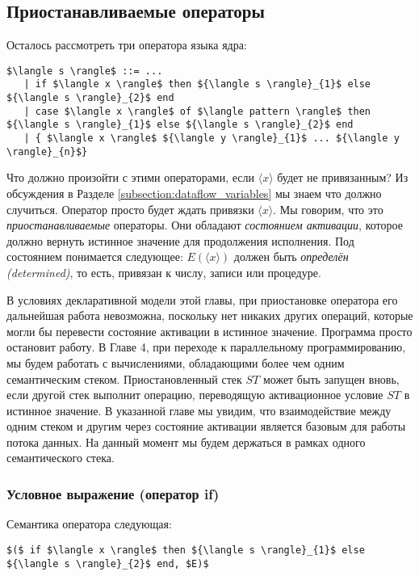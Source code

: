 \subsection{Приостанавливаемые операторы}

Осталось рассмотреть три оператора языка ядра:

\begin{lstlisting}
$\langle s \rangle$ ::= ...
   | if $\langle x \rangle$ then ${\langle s \rangle}_{1}$ else ${\langle s \rangle}_{2}$ end
   | case $\langle x \rangle$ of $\langle pattern \rangle$ then ${\langle s \rangle}_{1}$ else ${\langle s \rangle}_{2}$ end
   | { $\langle x \rangle$ ${\langle y \rangle}_{1}$ ... ${\langle y \rangle}_{n}$}
\end{lstlisting}

Что должно произойти с этими операторами, если $\langle x \rangle$ будет не привязанным? Из обсуждения в Разделе \ref{subsection:dataflow_variables} мы знаем что должно случиться. Оператор просто будет ждать привязки $\langle x \rangle$. Мы говорим, что это \emph{приостанавливаемые} операторы. Они обладают \emph{состоянием активации}, которое должно вернуть истинное значение для продолжения исполнения. Под состоянием понимается следующее: $E(\langle x \rangle)$ должен быть \emph{определён (determined)}, то есть, привязан к числу, записи или процедуре.

В условиях декларативной модели этой главы, при приостановке оператора его дальнейшая работа невозможна, поскольку нет никаких других операций, которые могли бы перевести состояние активации в истинное значение. Программа просто остановит работу. В Главе 4, при переходе к параллельному программированию, мы будем работать с вычислениями, обладающими более чем одним семантическим стеком. Приостановленный стек $ST$ может быть запущен вновь, если другой стек выполнит операцию, переводящую активационное условие $ST$ в истинное значение. В указанной главе мы увидим, что взаимодействие между одним стеком и другим через состояние активации является базовым для работы потока данных. На данный момент мы будем держаться в рамках одного семантического стека.

\subsubsection{Условное выражение (оператор if)}

Семантика оператора следующая:

\begin{lstlisting}
$($ if $\langle x \rangle$ then ${\langle s \rangle}_{1}$ else ${\langle s \rangle}_{2}$ end, $E)$
\end{lstlisting}

